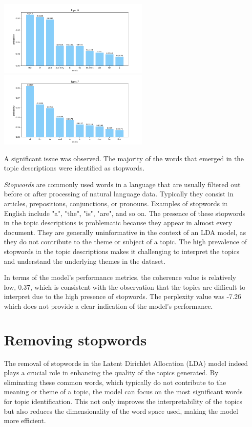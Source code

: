\documentclass[10pt]{article} %
\begin{document}
\begin{center}
		\includegraphics[width=7.5cm]{images/plots/test_8/topic_6.png}
		\includegraphics[width=7.5cm]{images/plots/test_8/topic_7.png}
	\end{center}

	A significant issue was observed. The majority of the words that emerged in the topic descriptions were identified as stopwords. 
	
	\textit{Stopwords} are commonly used words in a language that are usually filtered out before or after processing of natural language data. Typically they consist in articles, prepositions, conjunctions, or pronouns. Examples of stopwords in English include "a", "the", "is", "are", and so on. The presence of these stopwords in the topic descriptions is problematic because they appear in almost every document. They are generally uninformative in the context of an LDA model, as they do not contribute to the theme or subject of a topic. The high prevalence of stopwords in the topic descriptions makes it challenging to interpret the topics and understand the underlying themes in the dataset.
	
	In terms of the model's performance metrics, the coherence value is relatively low, 0.37, which is consistent with the observation that the topics are difficult to interpret due to the high presence of stopwords. The perplexity value was -7.26 which does not provide a clear indication of the model's performance. 
	
	\section{Removing stopwords}
	
	The removal of stopwords in the Latent Dirichlet Allocation (LDA) model indeed plays a crucial role in enhancing the quality of the topics generated. By eliminating these common words, which typically do not contribute to the meaning or theme of a topic, the model can focus on the most significant words for topic identification. This not only improves the interpretability of the topics but also reduces the dimensionality of the word space used, making the model more efficient.
	
\end{document}
